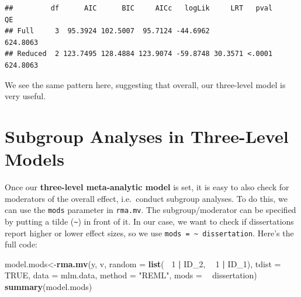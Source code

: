 \documentclass[]{book}
\newenvironment{Shaded}{\begin{snugshade}}{\end{snugshade}}
\newcommand{\DataTypeTok}[1]{\textcolor[rgb]{0.13,0.29,0.53}{#1}}
\newcommand{\DecValTok}[1]{\textcolor[rgb]{0.00,0.00,0.81}{#1}}
\newcommand{\KeywordTok}[1]{\textcolor[rgb]{0.13,0.29,0.53}{\textbf{#1}}}
\newcommand{\NormalTok}[1]{#1}
\newcommand{\OperatorTok}[1]{\textcolor[rgb]{0.81,0.36,0.00}{\textbf{#1}}}
\newcommand{\OtherTok}[1]{\textcolor[rgb]{0.56,0.35,0.01}{#1}}
\newcommand{\StringTok}[1]{\textcolor[rgb]{0.31,0.60,0.02}{#1}}
\begin{document}
\begin{verbatim}
##         df      AIC      BIC     AICc   logLik     LRT   pval       QE
## Full     3  95.3924 102.5007  95.7124 -44.6962                624.8063
## Reduced  2 123.7495 128.4884 123.9074 -59.8748 30.3571 <.0001 624.8063
\end{verbatim}

We see the same pattern here, suggesting that overall, our three-level model is very useful.

\hypertarget{subgroup-analyses-in-three-level-models}{%
\section{Subgroup Analyses in Three-Level Models}\label{subgroup-analyses-in-three-level-models}}

Once our \textbf{three-level meta-analytic model} is set, it is easy to also check for moderators of the overall effect, i.e.~conduct subgroup analyses. To do this, we can use the \texttt{mods} parameter in \texttt{rma.mv}. The subgroup/moderator can be specified by putting a tilde (\texttt{\textasciitilde{}}) in front of it. In our case, we want to check if dissertations report higher or lower effect sizes, so we use \texttt{mods\ =\ \textasciitilde{}\ dissertation}. Here's the full code:

\begin{Shaded}
\begin{Highlighting}[]
\NormalTok{model.mods<-}\KeywordTok{rma.mv}\NormalTok{(y, }
\NormalTok{                   v, }
                   \DataTypeTok{random =} \KeywordTok{list}\NormalTok{(}\OperatorTok{~}\StringTok{ }\DecValTok{1} \OperatorTok{|}\StringTok{ }\NormalTok{ID_}\DecValTok{2}\NormalTok{, }
                                 \OperatorTok{~}\StringTok{ }\DecValTok{1} \OperatorTok{|}\StringTok{ }\NormalTok{ID_}\DecValTok{1}\NormalTok{), }
                   \DataTypeTok{tdist =} \OtherTok{TRUE}\NormalTok{, }
                   \DataTypeTok{data =}\NormalTok{ mlm.data,}
                   \DataTypeTok{method =} \StringTok{"REML"}\NormalTok{,}
                   \DataTypeTok{mods =} \OperatorTok{~}\StringTok{ }\NormalTok{dissertation)}
\KeywordTok{summary}\NormalTok{(model.mods)}
\end{Highlighting}
\end{Shaded}
\end{document}
